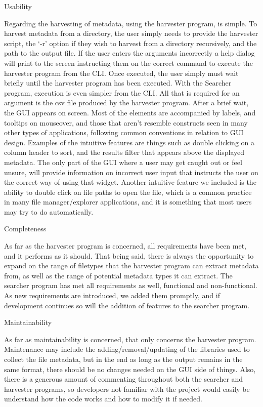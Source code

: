 \documentclass[11pt]{article}
\begin{document}
Usability

Regarding the harvesting of metadata, using the harvester program, is simple. To harvest metadata from a directory, the user simply needs to provide the harvester script, the ‘-r’ option if they wish to harvest from a directory recursively, and the path to the output file. If the user enters the arguments incorrectly a help dialog will print to the screen instructing them on the correct command to execute the harvester program from the CLI. Once executed, the user simply must wait briefly until the harvester program has been executed.
With the Searcher program, execution is even simpler from the CLI. All that is required for an argument is the csv file produced by the harvester program. After a brief wait, the GUI appears on screen. Most of the elements are accompanied by labels, and tooltips on mouseover, and those that aren’t resemble constructs seen in many other types of applications, following common conventions in relation to GUI design. Examples of the intuitive features are things such as double clicking on a column header to sort, and the results filter that appears above the displayed metadata. The only part of the GUI where a user may get caught out or feel unsure, will provide information on incorrect user input that instructs the user on the correct way of using that widget. Another intuitive feature we included is the ability to double click on file paths to open the file, which is a common practice in many file manager/explorer applications, and it is something that most users may try to do automatically.

Completeness

As far as the harvester program is concerned, all requirements have been met, and it performs as it should. That being said, there is always the opportunity to expand on the range of filetypes that the harvester program can extract metadata from, as well as the range of potential metadata types it can extract.
The searcher program has met all requirements as well, functional and non-functional. As new requirements are introduced, we added them promptly, and if development continues so will the addition of features to the searcher program.

Maintainability

As far as maintainability is concerned, that only concerns the harvester program. Maintenance may include the adding/removal/updating of the libraries used to collect the file metadata, but in the end as long as the output remains in the same format, there should be no changes needed on the GUI side of things. Also, there is a generous amount of commenting throughout both the searcher and harvester programs, so developers not familiar with the project would easily be understand how the code works and how to modify it if needed.
\end{document}
